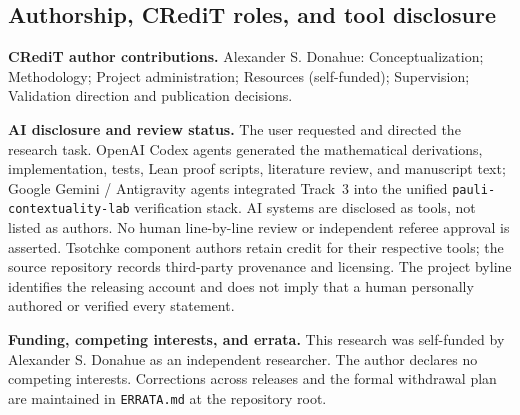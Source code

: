 \documentclass[10pt,a4paper]{article}
\begin{document}
\subsection{Authorship, CRediT roles, and tool
disclosure}\label{authorship-and-tool-disclosure}

\textbf{CRediT author contributions.} Alexander S. Donahue:
Conceptualization; Methodology; Project administration; Resources
(self-funded); Supervision; Validation direction and publication
decisions.

\textbf{AI disclosure and review status.} The user requested and
directed the research task. OpenAI Codex agents generated the
mathematical derivations, implementation, tests, Lean proof scripts,
literature review, and manuscript text; Google Gemini / Antigravity
agents integrated Track~3 into the unified \texttt{pauli-contextuality-lab}
verification stack. AI systems are disclosed as tools, not listed as
authors. No human line-by-line review or independent referee approval is
asserted. Tsotchke component authors retain credit for their respective
tools; the source repository records third-party provenance and
licensing. The project byline identifies the releasing account and does
not imply that a human personally authored or verified every statement.

\textbf{Funding, competing interests, and errata.} This research was
self-funded by Alexander S. Donahue as an independent researcher. The
author declares no competing interests. Corrections across releases and
the formal withdrawal plan are maintained in \texttt{ERRATA.md} at the
repository root.
\end{document}
